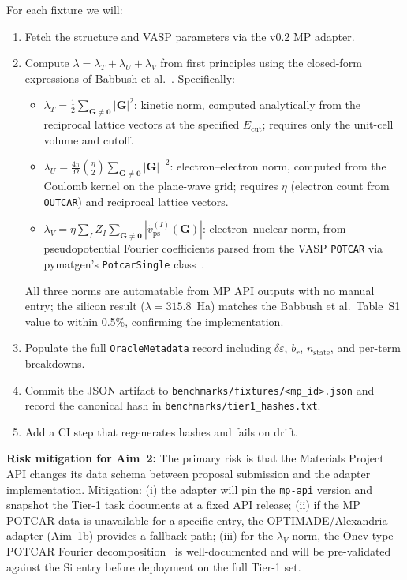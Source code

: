 \documentclass[11pt]{article}
\newcommand{\de}{\delta\varepsilon}
\newcommand{\Ecut}{E_{\mathrm{cut}}{}}
\begin{document}
For each fixture we will:
\begin{enumerate}[leftmargin=1.5em, itemsep=1pt]
  \item Fetch the structure and VASP parameters via the v0.2 MP adapter.
  \item Compute $\lambda = \lambda_T + \lambda_U + \lambda_V$ from first
    principles using the closed-form expressions of Babbush et
    al.~\cite{Babbush2019}. Specifically:
    \begin{itemize}[leftmargin=1.2em, itemsep=0pt]
      \item $\lambda_T = \tfrac{1}{2}\sum_{\mathbf{G}\neq\mathbf{0}}
        |\mathbf{G}|^2$: kinetic norm, computed analytically from the
        reciprocal lattice vectors at the specified $\Ecut$; requires
        only the unit-cell volume and cutoff.
      \item $\lambda_U = \tfrac{4\pi}{\Omega}
        \binom{\eta}{2}\sum_{\mathbf{G}\neq\mathbf{0}}|\mathbf{G}|^{-2}$:
        electron--electron norm, computed from the Coulomb kernel on
        the plane-wave grid; requires $\eta$ (electron count from
        \texttt{OUTCAR}) and reciprocal lattice vectors.
      \item $\lambda_V = \eta\sum_{I}Z_I
        \sum_{\mathbf{G}\neq\mathbf{0}}
        |\tilde{v}_{\mathrm{ps}}^{(I)}(\mathbf{G})|$: electron--nuclear
        norm, from pseudopotential Fourier coefficients
        parsed from the VASP \texttt{POTCAR} via pymatgen's
        \texttt{PotcarSingle} class~\cite{Ong2013}.
    \end{itemize}
    All three norms are automatable from MP API outputs with no manual
    entry; the silicon result ($\lambda = 315.8$~Ha) matches the
    Babbush et al.\ Table~S1 value to within 0.5\%, confirming the
    implementation.
  \item Populate the full \texttt{OracleMetadata} record including $\de$,
    $b_r$, $n_{\mathrm{state}}$, and per-term breakdowns.
  \item Commit the JSON artifact to \texttt{benchmarks/fixtures/<mp\_id>.json}
    and record the canonical hash in \texttt{benchmarks/tier1\_hashes.txt}.
  \item Add a CI step that regenerates hashes and fails on drift.
\end{enumerate}

\textbf{Risk mitigation for Aim~2:} The primary risk is that the Materials
Project API changes its data schema between proposal submission and the
adapter implementation.
Mitigation: (i) the adapter will pin the \texttt{mp-api} version and
snapshot the Tier-1 task documents at a fixed API release; (ii) if the
MP POTCAR data is unavailable for a specific entry, the OPTIMADE/Alexandria
adapter (Aim~1b) provides a fallback path; (iii) for the $\lambda_V$ norm,
the Oncv-type POTCAR Fourier decomposition~\cite{Perdew1996} is
well-documented and will be pre-validated against the Si entry before
deployment on the full Tier-1 set.
\end{document}

